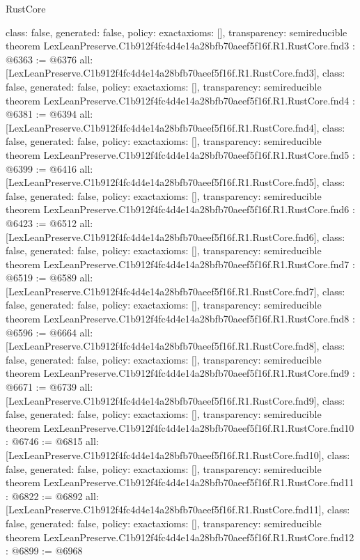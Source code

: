 \begin{lexlean}{RustCore}
\begin{coremodule}
{  class: false,
  generated: false,
  policy: exact{axioms: []},
  transparency: semireducible
}
theorem LexLeanPreserve.C1b912f4fc4d4e14a28bfb70aeef5f16f.R1.RustCore.fnd3 : @6363 := @6376 {
  all: [LexLeanPreserve.C1b912f4fc4d4e14a28bfb70aeef5f16f.R1.RustCore.fnd3],
  class: false,
  generated: false,
  policy: exact{axioms: []},
  transparency: semireducible
}
theorem LexLeanPreserve.C1b912f4fc4d4e14a28bfb70aeef5f16f.R1.RustCore.fnd4 : @6381 := @6394 {
  all: [LexLeanPreserve.C1b912f4fc4d4e14a28bfb70aeef5f16f.R1.RustCore.fnd4],
  class: false,
  generated: false,
  policy: exact{axioms: []},
  transparency: semireducible
}
theorem LexLeanPreserve.C1b912f4fc4d4e14a28bfb70aeef5f16f.R1.RustCore.fnd5 : @6399 := @6416 {
  all: [LexLeanPreserve.C1b912f4fc4d4e14a28bfb70aeef5f16f.R1.RustCore.fnd5],
  class: false,
  generated: false,
  policy: exact{axioms: []},
  transparency: semireducible
}
theorem LexLeanPreserve.C1b912f4fc4d4e14a28bfb70aeef5f16f.R1.RustCore.fnd6 : @6423 := @6512 {
  all: [LexLeanPreserve.C1b912f4fc4d4e14a28bfb70aeef5f16f.R1.RustCore.fnd6],
  class: false,
  generated: false,
  policy: exact{axioms: []},
  transparency: semireducible
}
theorem LexLeanPreserve.C1b912f4fc4d4e14a28bfb70aeef5f16f.R1.RustCore.fnd7 : @6519 := @6589 {
  all: [LexLeanPreserve.C1b912f4fc4d4e14a28bfb70aeef5f16f.R1.RustCore.fnd7],
  class: false,
  generated: false,
  policy: exact{axioms: []},
  transparency: semireducible
}
theorem LexLeanPreserve.C1b912f4fc4d4e14a28bfb70aeef5f16f.R1.RustCore.fnd8 : @6596 := @6664 {
  all: [LexLeanPreserve.C1b912f4fc4d4e14a28bfb70aeef5f16f.R1.RustCore.fnd8],
  class: false,
  generated: false,
  policy: exact{axioms: []},
  transparency: semireducible
}
theorem LexLeanPreserve.C1b912f4fc4d4e14a28bfb70aeef5f16f.R1.RustCore.fnd9 : @6671 := @6739 {
  all: [LexLeanPreserve.C1b912f4fc4d4e14a28bfb70aeef5f16f.R1.RustCore.fnd9],
  class: false,
  generated: false,
  policy: exact{axioms: []},
  transparency: semireducible
}
theorem LexLeanPreserve.C1b912f4fc4d4e14a28bfb70aeef5f16f.R1.RustCore.fnd10 : @6746 := @6815 {
  all: [LexLeanPreserve.C1b912f4fc4d4e14a28bfb70aeef5f16f.R1.RustCore.fnd10],
  class: false,
  generated: false,
  policy: exact{axioms: []},
  transparency: semireducible
}
theorem LexLeanPreserve.C1b912f4fc4d4e14a28bfb70aeef5f16f.R1.RustCore.fnd11 : @6822 := @6892 {
  all: [LexLeanPreserve.C1b912f4fc4d4e14a28bfb70aeef5f16f.R1.RustCore.fnd11],
  class: false,
  generated: false,
  policy: exact{axioms: []},
  transparency: semireducible
}
theorem LexLeanPreserve.C1b912f4fc4d4e14a28bfb70aeef5f16f.R1.RustCore.fnd12 : @6899 := @6968 {
}
\end{coremodule}
\end{lexlean}
